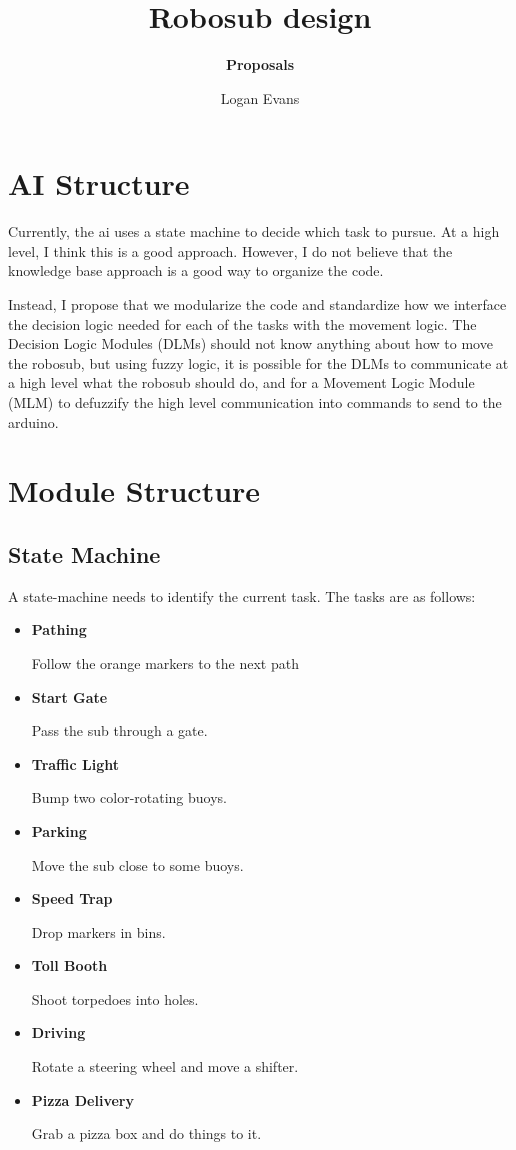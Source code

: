 \documentclass[11pt]{scrartcl}
\title{\textbf{Robosub design}}
\subtitle{\textbf{Proposals}}
\author{Logan Evans}
\begin{document}
\maketitle

\section{AI Structure}
  Currently, the ai uses a state machine to decide which task to pursue. At a high level, I think this is a good approach. However, I do not believe that the knowledge base approach is a good way to organize the code.

  Instead, I propose that we modularize the code and standardize how we interface the decision logic needed for each of the tasks with the movement logic. The Decision Logic Modules (DLMs) should not know anything about how to move the robosub, but using fuzzy logic, it is possible for the DLMs to communicate at a high level what the robosub should do, and for a Movement Logic Module (MLM) to defuzzify the high level communication into commands to send to the arduino.

\section{Module Structure}
  \subsection{State Machine}
  A state-machine needs to identify the current task. The tasks are as follows:

  \begin{itemize}
    \item {\bf Pathing}

      Follow the orange markers to the next path

    \item {\bf Start Gate}

      Pass the sub through a gate.

    \item {\bf Traffic Light}

      Bump two color-rotating buoys.

    \item {\bf Parking}

      Move the sub close to some buoys.

    \item {\bf Speed Trap}

      Drop markers in bins.

    \item {\bf Toll Booth}

      Shoot torpedoes into holes.

    \item {\bf Driving}

      Rotate a steering wheel and move a shifter.

    \item {\bf Pizza Delivery}

      Grab a pizza box and do things to it.

  \end{itemize}
\end{document}
